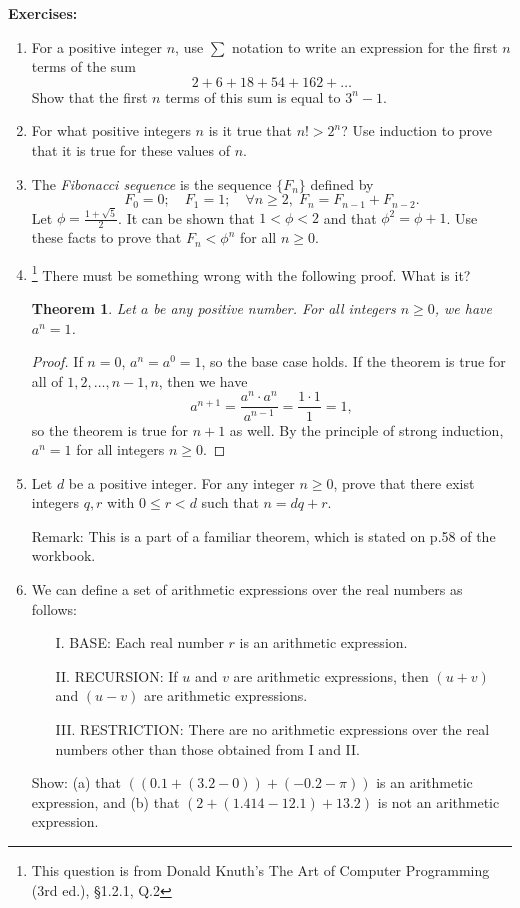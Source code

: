 \documentclass[a4paper,12pt]{article}
\newtheorem{theorem}{Theorem}
\begin{document}
\pagestyle{myheadings}


{\bf Exercises:}

\begin{enumerate}
\item
For a positive integer $n$, use $\sum$ notation to write an expression for the
first $n$ terms of the sum
\[
    2 + 6 + 18 + 54 + 162 + \dots
\]
Show that the first $n$ terms of this sum is equal to $3^n-1$.
\item
For what positive integers $n$ is it true that $n! > 2^n$? Use induction to
prove that it is true for these values of $n$.
\item
The {\em Fibonacci sequence} is the sequence $\{F_n\}$ defined by
\[
    F_0 = 0; \quad F_1 = 1; \quad \forall n \geq 2,\; F_n = F_{n-1} + F_{n-2}.
\]
Let $\phi = \frac{1 + \sqrt{5}}{2}$. It can be shown that $1 < \phi < 2$
and that $\phi^2 = \phi + 1$. Use these facts to
prove that $F_n < \phi^n$ for all $n \geq 0$.
\item
\footnote{This question is from Donald Knuth's The Art of Computer
Programming (3rd ed.), \S 1.2.1, Q.2}
There must be something wrong with the following proof. What is it?
\begin{theorem}
Let $a$ be any positive number. For all integers $n \geq 0$, we have $a^n = 1$.
\end{theorem}
\begin{proof}
If $n = 0$, $a^n = a^0 = 1$, so the base case holds.
If the theorem is true for all of $1, 2, \dots, n-1, n$, then we have
\[
    a^{n+1} = \frac{a^n \cdot a^n}{a^{n-1}} = \frac{1 \cdot 1}{1} = 1,
\]
so the theorem is true for $n+1$ as well. By the principle of strong induction,
$a^n = 1$ for all integers $n \geq 0$.
\end{proof}
\item
Let $d$ be a positive integer. For any integer $n \geq 0$, prove that there
exist integers $q, r$ with $0 \leq r < d$ such that $n = dq+r$.

Remark: This is a part of a familiar theorem, which is stated on p.58 of the
workbook.
\item
We can define a set of arithmetic expressions over the real numbers as follows:
\begin{itemize}
\item[I.] BASE: Each real number $r$ is an arithmetic expression.
\item[II.] RECURSION: If $u$ and $v$ are arithmetic expressions, then $(u+v)$
and $(u-v)$ are arithmetic expressions.
\item[III.] RESTRICTION: There are no arithmetic expressions over the real
numbers other than those obtained from I and II.
\end{itemize}
Show: (a) that $((0.1+(3.2-0))+(-0.2-\pi))$ is an arithmetic expression, and
(b) that $(2 + (1.414 - 12.1) + 13.2)$ is not an arithmetic expression.
\end{enumerate}
\end{document}

